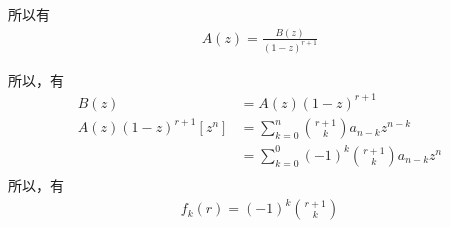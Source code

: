 \documentclass[]{article}
\begin{document}
所以有
\begin{align}
    A(z) = \frac{B(z)}{(1-z)^{r+1}}
\end{align}

所以，有
\begin{align}
    B(z) &= A(z)(1-z)^{r+1}\\
    A(z)(1-z)^{r+1}[z^n] &= \sum_{k=0}^{n} \binom{r+1}{k}a_{n-k}z^{n-k} \\
    &= \sum_{k=0}^{0}(-1)^k\binom{r+1}{k}a_{n-k}z^{n}\\
\end{align}
所以，有
\begin{align}
    f_{k}(r) = (-1)^k\binom{r+1}{k}
\end{align}




\end{document}
